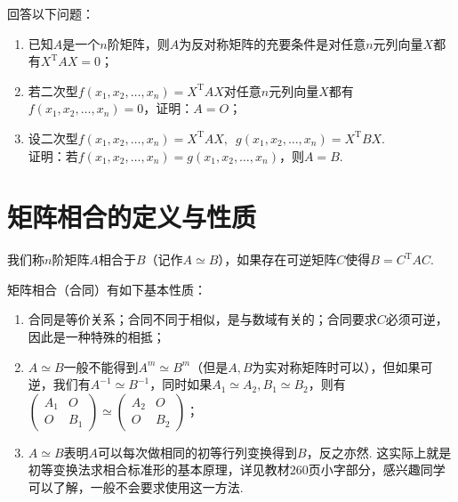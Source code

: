 \begin{example}{}{}
    回答以下问题：
    \begin{enumerate}
        \item 已知$A$是一个$n$阶矩阵，则$A$为反对称矩阵的充要条件是对任意$n$元列向量$X$都有$X^\mathrm{T}AX=0$；

        \item 若二次型$f(x_1,x_2,\ldots,x_n)=X^\mathrm{T}AX$对任意$n$元列向量$X$都有$f(x_1,x_2,\ldots,x_n)=0$，证明：$A=O$；

        \item 设二次型$f(x_1,x_2,\ldots,x_n)=X^\mathrm{T}AX,\enspace g(x_1,x_2,\ldots,x_n)=X^\mathrm{T}BX$.\\
              证明：若$f(x_1,x_2,\ldots,x_n)=g(x_1,x_2,\ldots,x_n)$，则$A=B$.
    \end{enumerate}
\end{example}

\section{矩阵相合的定义与性质}

\begin{definition}{}{}
    我们称$n$阶矩阵$A$相合于$B$（记作$A\simeq B$），如果存在可逆矩阵$C$使得$B=C^\mathrm{T}AC$.
\end{definition}
矩阵相合（合同）有如下基本性质：
\begin{enumerate}
    \item 合同是等价关系；合同不同于相似，是与数域有关的；合同要求$C$必须可逆，因此是一种特殊的相抵；

    \item $A\simeq B$一般不能得到$A^m\simeq B^m$（但是$A,B$为实对称矩阵时可以），但如果可逆，我们有$A^{-1}\simeq B^{-1}$，同时如果$A_1\simeq A_2,B_1\simeq B_2$，则有$\begin{pmatrix}
                  A_1 & O \\ O & B_1
              \end{pmatrix}\simeq\begin{pmatrix}
                  A_2 & O \\ O & B_2
              \end{pmatrix}$；

    \item $A\simeq B$表明$A$可以每次做相同的初等行列变换得到$B$，反之亦然. 这实际上就是初等变换法求相合标准形的基本原理，详见教材260页小字部分，感兴趣同学可以了解，一般不会要求使用这一方法.
\end{enumerate}

